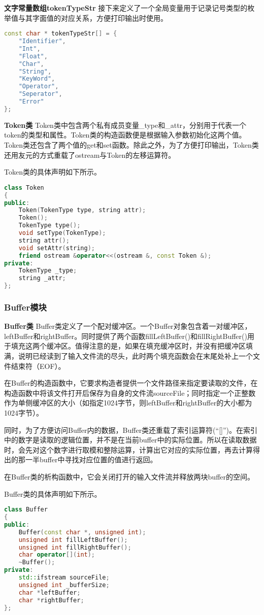 \documentclass[twocolumn]{article}
\begin{document}
\textbf{文字常量数组tokenTypeStr }接下来定义了一个全局变量用于记录记号类型的枚举值与其字面值的对应关系，方便打印输出时使用。

\begin{lstlisting}[language=C++]
const char * tokenTypeStr[] = {
    "Identifier",
    "Int",
    "Float",
    "Char",
    "String",
    "KeyWord",
    "Operator",
    "Seperator",
    "Error"
};
\end{lstlisting}

\textbf{Token类 }Token类中包含两个私有成员变量\_type和\_attr，分别用于代表一个token的类型和属性。Token类的构造函数便是根据输入参数初始化这两个值。Token类还包含了两个值的get和set函数。除此之外，为了方便打印输出，Token类还用友元的方式重载了ostream与Token的左移运算符。

Token类的具体声明如下所示。
\begin{lstlisting}[language=C++]
class Token
{
public:
    Token(TokenType type, string attr);
    Token();
    TokenType type();
    void setType(TokenType);
    string attr();
    void setAttr(string);
    friend ostream &operator<<(ostream &, const Token &);
private:
    TokenType _type;
    string _attr;
};
\end{lstlisting}

\subsubsection{Buffer模块}
\textbf{Buffer类 }Buffer类定义了一个配对缓冲区。一个Buffer对象包含着一对缓冲区，leftBuffer和rightBuffer。同时提供了两个函数fillLeftBuffer()和fillRightBuffer()用于填充这两个缓冲区。值得注意的是，如果在填充缓冲区时，并没有把缓冲区填满，说明已经读到了输入文件流的尽头，此时两个填充函数会在末尾处补上一个文件结束符（EOF）。

在Buffer的构造函数中，它要求构造者提供一个文件路径来指定要读取的文件，在构造函数中将该文件打开后保存为自身的文件流sourceFile；同时指定一个正整数作为单侧缓冲区的大小（如指定1024字节，则leftBuffer和rightBuffer的大小都为1024字节）。

同时，为了方便访问Buffer内的数据，Buffer类还重载了索引运算符(“[]”)。在索引中的数字是读取的逻辑位置，并不是在当前buffer中的实际位置。所以在读取数据时，会先对这个数字进行取模和整除运算，计算出它对应的实际位置，再去计算得出的那一半buffer中寻找对应位置的值进行返回。

在Buffer类的析构函数中，它会关闭打开的输入文件流并释放两块buffer的空间。

Buffer类的具体声明如下所示。

\begin{lstlisting}[language=C++]
class Buffer 
{
public:
    Buffer(const char *, unsigned int);
    unsigned int fillLeftBuffer();
    unsigned int fillRightBuffer();
    char operator[](int);
    ~Buffer();
private:
    std::ifstream sourceFile;
    unsigned int _bufferSize;
    char *leftBuffer;
    char *rightBuffer;
};
\end{lstlisting}
\end{document}
